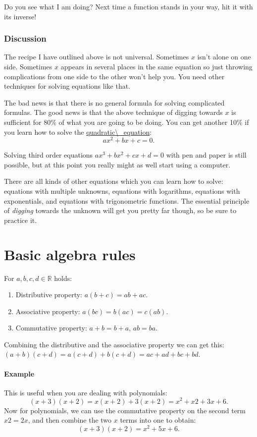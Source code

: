 \documentclass[twocolumn,8pt]{extarticle}
\newcommand{\dokutitleleveltwo}[1]{\section{#1}}
\newcommand{\dokutitlelevelfour}[1]{\subsubsection{#1}}
\newcommand{\dokutitlelevelfive}[1]{\paragraph{#1}}
\newcommand{\dokuitalic}[1]{\textsl{#1}}
\newcommand{\dokuitem}{\item}
\begin{document}
Do you see what I am doing?
Next time a function stands in your way, hit it with its inverse!


\dokutitlelevelfour{Discussion}

The recipe I have outlined above is not universal.
Sometimes \(x\) isn't alone on one side. Sometimes \(x\) appears in several places in the same equation
so just throwing complications from one side to the other won't help you.
You need other techniques for solving equations like that.

The bad news is that there is no general formula for solving complicated formulas.
The good news is that the above technique of digging towards \(x\) is sufficient for 80\% 
of what you are going to be doing.
You can get another 10\% if you learn how to solve the \hyperref[470dad9cac00a9924004d164cb491a31]{quadratic{\textbackslash}\_equation}:
\[
  ax^2 +bx + c = 0.
\]

Solving third order equations \(ax^3+bx^2+cx+d=0\) with 
pen and paper is still possible, but at this point you really
might as well start using a computer. 

There are all kinds of other equations which you can learn how
to solve: equations with multiple unknowns, equations with
logarithms, equations with exponentials, and equations
with trigonometric functions.
The essential principle of \dokuitalic{digging}
towards the unknown will get you pretty far though, so be sure
to practice it.





\dokutitleleveltwo{Basic algebra rules}
\label{c3e38dc40d7a0015b4d8b65d875bd50b}%

For \(a,b,c,d\in\mathbb{R}\) holds:


\begin{enumerate}\dokuitem  Distributive property: \(a(b+c)=ab+ac\).
\dokuitem  Associative property: \(a(bc)=b(ac)=c(ab)\).
\dokuitem  Commutative property: \(a+b=b+a\), \(ab=ba\).
\end{enumerate}

Combining the distributive and the associative property we can get this: \\ 
\((a+b)(c+d)=a(c+d) + b(c+d) = ac+ad+bc+bd\).


\dokutitlelevelfive{Example}
This is useful when you are dealing with polynomials:
\[
  (x+3)(x+2)=x(x+2) + 3(x+2)= x^2 +x2 +3x + 6.
\]
Now for polynomials, we can use the commutative property
on the second term \(x2=2x\), and then combine the
two \(x\) terms into one to obtain:
\[
  (x+3)(x+2)= x^2 + 5x + 6.
\]
\end{document}
